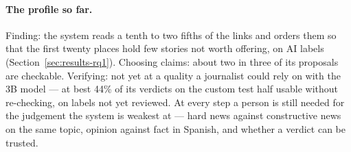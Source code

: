 \paragraph{The profile so far.} Finding: the system reads a tenth to
two fifths of the links and orders them so that the first twenty
places hold few stories not worth offering, on AI labels
(Section~\ref{sec:results-rq1}). Choosing claims: about two in three of
its proposals are checkable. Verifying: not yet at a quality a
journalist could rely on with the 3B model --- at best 44\% of its
verdicts on the custom test half usable without re-checking, on labels
not yet reviewed.
At every step a person is still needed for the judgement the system is
weakest at --- hard news against constructive news on the same topic,
opinion against fact in Spanish, and whether a verdict can be trusted.
